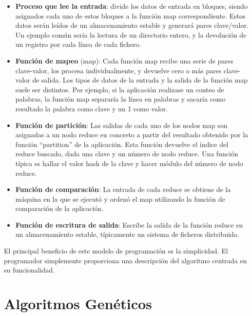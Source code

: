 \documentclass[runningheads]{llncs}
\begin{document}
\begin{itemize}
 \item \textbf{Proceso que lee la entrada}: divide los datos de entrada en bloques, siendo asignados cada uno de estos bloques a la 
 función map correspondiente. Estos datos serán leídos de un almacenamiento estable y generará pares clave/valor. 
 Un ejemplo común sería la lectura de un directorio entero, y la devolución de un registro por cada línea de cada fichero.

 \item \textbf{Función de mapeo} (map): Cada función map recibe una serie de pares clave-valor, los procesa individualmente, y 
 devuelve cero o más pares clave-valor de salida. Los tipos de datos de la entrada y la salida de la función map suele ser
distintos. Por ejemplo, si la aplicación realizase un conteo de palabras, la función map separaría la línea en palabras y 
sacaría como resultado la palabra como clave y un 1 como valor.
 
 \item \textbf{Función de partición}: Las salidas de cada uno de los nodos map son asignadas a un nodo reduce en concreto a 
 partir del resultado obtenido por la función ``partition'' de la aplicación. Esta función devuelve el índice del reduce buscado, 
 dada una clave y un número de nodo reduce. Una función típica es hallar el valor hash de la clave y hacer módulo del número 
 de nodo reduce.

 \item \textbf{Función de comparación}: La entrada de cada reduce se obtiene de la máquina en la que se ejecutó y ordenó el 
 map utilizando la función de comparación de la aplicación.

 \item \textbf{Función de escritura de salida}: Escribe la salida de la función reduce en un almacenamiento estable, típicamente 
 un sistema de ficheros distribuido.
 
\end{itemize}

El principal beneficio de este modelo de programación es la simplicidad. El programador simplemente proporciona una descripción 
del algoritmo centrada en su funcionalidad.



\section{Algoritmos Genéticos}
\label{sec:ags}
\end{document}

